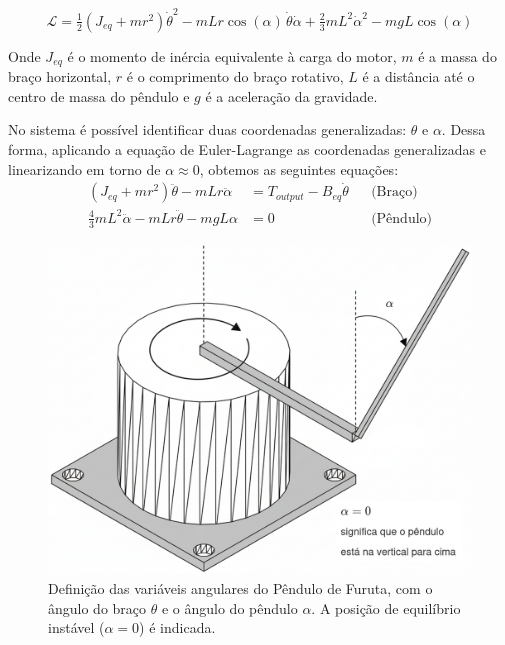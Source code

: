 \documentclass[9pt,a4paper,twocolumn,twoside]{tau-class/tau}
\begin{document}
    \begin{equation}
    \mathcal{L} = \tfrac{1}{2}(J_{eq} + m r^2)\dot{\theta}^2
        - m L r \cos(\alpha)\,\dot{\theta}\dot{\alpha}
        + \tfrac{2}{3} m L^2 \dot{\alpha}^2
        - m g L \cos(\alpha)
    \end{equation}

    Onde $J_{eq}$ é o momento de inércia equivalente à carga do motor, $m$ é a massa do braço horizontal, $r$ é o comprimento do braço
    rotativo, $L$ é a distância até o centro de massa do pêndulo e $g$ é a aceleração da gravidade.
    
    No sistema é possível identificar
    duas coordenadas generalizadas: \(\theta\) e \(\alpha\). Dessa forma, aplicando a equação de Euler-Lagrange as coordenadas generalizadas
    e linearizando em torno de $\alpha \approx 0$, obtemos as seguintes equações: \\

    \begin{align}
    (J_{eq} + m r^2)\ddot{\theta} - m L r \ddot{\alpha} &= T_{output} - B_{eq}\dot{\theta} 
    && \text{(Braço)} \\
    \tfrac{4}{3} m L^2 \ddot{\alpha} - m L r \ddot{\theta} - m g L \alpha &= 0
    && \text{(Pêndulo)}
    \end{align}

    \begin{figure}[H]
    \centering
    \includegraphics[width=0.9\columnwidth]{figures/angulo_pendulo.png} %
    \caption{Definição das variáveis angulares do Pêndulo de Furuta, com o ângulo do braço \(\theta\) e o ângulo do pêndulo \(\alpha\). A posição de equilíbrio instável (\(\alpha=0\)) é indicada.}
    \label{fig:angulo_pendulo}
    \end{figure}
\end{document}
